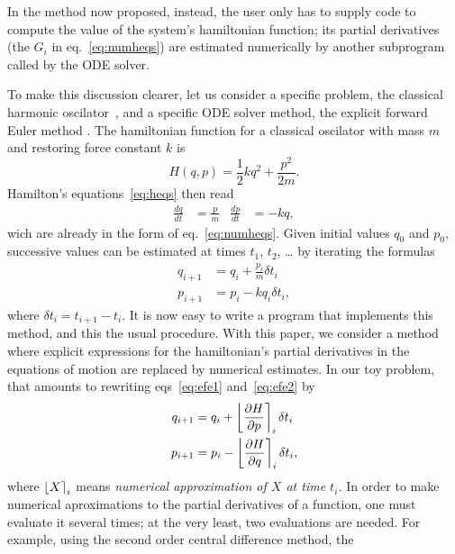 \documentclass{iopart}
\newcommand{\numap}[1]{\ensuremath{%
    \left\lfloor#1\right\rceil
}}
\begin{document}
In the method now proposed, instead, the user only has to supply code to
compute the value of the system's hamiltonian function; its partial derivatives
(the $G_i$ in eq.~\eqref{eq:numheqs}) are estimated numerically by another
subprogram called by the ODE solver. 


To make this discussion clearer, let us consider a specific problem, the
classical harmonic oscilator~\cite{french:71}, and a specific ODE solver method,
the explicit forward Euler method \cite{sir:2010}. The hamiltonian function for
a classical oscilator with mass $m$ and restoring force constant $k$ is 
\begin{equation}
  H(q,p)=\frac{1}{2}kq^2+\frac{p^2}{2m}.
\end{equation}
Hamilton's equations~\eqref{eq:heqs} then read
\begin{align}
  \frac{dq}{dt}&=\frac{p}{m}&
  \frac{dp}{dt}&=-kq,
\end{align}
wich are already in the form of eq.~\eqref{eq:numheqs}. Given initial values
$q_0$ and $p_0,$ successive values can be estimated at times $t_1$, $t_2$, \ldots
by iterating the formulas
\begin{align}
  q_{i+1}&=q_{i}+\frac{p_i}{m}\delta t_i\label{eq:efe1}\\
  p_{i+1}&=p_{i}-kq_i\delta t_i\label{eq:efe2},
\end{align}
where $\delta t_i=t_{i+1}-t_i$. It is now easy to write a  program that
implements this method, and this the usual procedure. With this paper, we
consider a method where explicit expressions for the hamiltonian's partial
derivatives in the equations of motion are replaced by numerical estimates. In
our toy problem, that amounts to rewriting eqs~\eqref{eq:efe1}
and~\eqref{eq:efe2} by
\begin{align*}
  q_{i+1}&=q_{i}+\numap{\frac{\partial H}{\partial p}}_i \delta t_i\\
  p_{i+1}&=p_{i}-\numap{\frac{\partial H}{\partial q}}_i\delta t_i,
\end{align*}
where $\numap{X}_i$ means \emph{numerical approximation of $X$ at time $t_i$.}
In order to make numerical aproximations to the partial derivatives of a
function, one must evaluate it several times; at the very least, two evaluations
are needed. For example, using the second order central difference method, the
\end{document}
